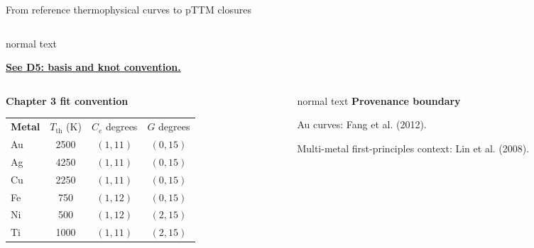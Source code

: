 \documentclass[aspectratio=169,10pt]{beamer}
\begin{document}
\begin{frame}[t]{From reference thermophysical curves to pTTM closures}
\begin{columns}[T,totalwidth=0.94\textwidth]
\begin{column}{0.43\textwidth}
\begin{beamercolorbox}[wd=\linewidth,sep=0.52em]{normal text}
\par
        \vspace{0.05cm}\scriptsize\hyperlink{supp:sampling-spline-basis}{\color{GVTeal}\textbf{See D5: basis and knot convention.}}
      \end{beamercolorbox}
    \end{column}
  \end{columns}
  \vspace{0.13cm}
  \begin{columns}[T,totalwidth=0.94\textwidth]
    \begin{column}{0.58\textwidth}
      \centering\scriptsize
      \textbf{Chapter 3 fit convention}\par
      \vspace{0.04cm}
      \begin{tabular}{@{}lccc@{}}
        \rowcolor{black!10}\textbf{Metal} & \(T_{\mathrm{th}}\) (K) & \(C_e\) degrees & \(G\) degrees\\
        Au & 2500 & \((1,11)\) & \((0,15)\)\\
        Ag & 4250 & \((1,11)\) & \((0,15)\)\\
        Cu & 2250 & \((1,11)\) & \((0,15)\)\\
        Fe & 750 & \((1,12)\) & \((0,15)\)\\
        Ni & 500 & \((1,12)\) & \((2,15)\)\\
        Ti & 1000 & \((1,11)\) & \((2,15)\)
      \end{tabular}
    \end{column}
    \begin{column}{0.32\textwidth}
      \begin{beamercolorbox}[wd=\linewidth,sep=0.40em]{normal text}
        \scriptsize\textbf{\color{GVSlate}Provenance boundary}\par
        \vspace{0.05cm}
        \scriptsize Au curves: Fang et al. (2012).\par
        \vspace{0.05cm}
        \scriptsize Multi-metal first-principles context: Lin et al. (2008).\par
        \vspace{0.05cm}

\end{beamercolorbox}
\end{column}
\end{columns}
\end{frame}
\end{document}
